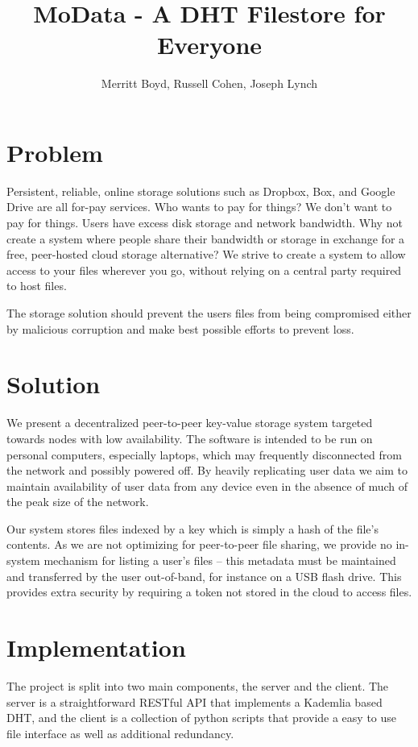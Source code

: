 \documentclass[a4paper,10pt]{article}
\title{MoData - A DHT Filestore for Everyone}
\author{Merritt Boyd, Russell Cohen, Joseph Lynch}
\begin{document}
\maketitle

\section{Problem}
Persistent, reliable, online storage solutions such as Dropbox, Box, and Google 
Drive are all for-pay services. Who wants to pay for things? We don’t want to 
pay for things. Users have excess disk storage and network bandwidth. Why not 
create a system where people share their bandwidth or storage in exchange for a 
free, peer-hosted cloud storage alternative? We strive to create a system to 
allow access to your files wherever you go, without relying on a central party 
required to host files.

The storage solution should prevent the users files from being compromised 
either by malicious corruption and make best possible efforts to prevent loss.

\section{Solution}
We present a decentralized peer-to-peer key-value storage system targeted 
towards nodes with low availability.  The software is intended to be run on 
personal computers, especially laptops, which may frequently disconnected from 
the network and possibly powered off.  By heavily replicating user data we aim 
to maintain availability of user data from any device even in the absence of 
much of the peak size of the network.

Our system stores files indexed by a key which is simply a hash of the file’s 
contents.  As we are not optimizing for peer-to-peer file sharing, we provide no 
in-system mechanism for listing a user’s files -- this metadata must be 
maintained and transferred by the user out-of-band, for instance on a USB flash 
drive.  This provides extra security by requiring a token not stored in the 
cloud to access files.

\section{Implementation}
The project is split into two main components, the server and the client.  The 
server is a straightforward RESTful API that implements a Kademlia based DHT, 
and the client is a collection of python scripts that provide a easy to use file 
interface as well as additional redundancy.
\end{document}
